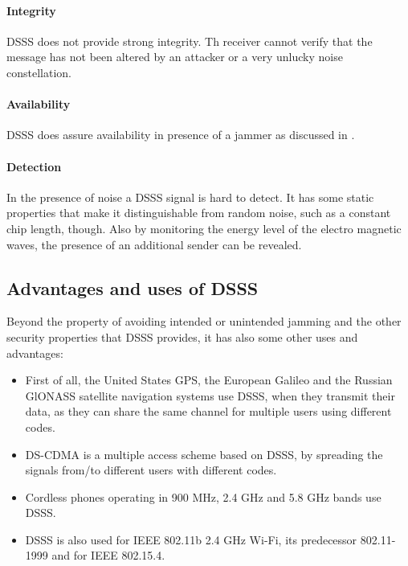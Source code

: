 \documentclass[12pt,a4paper]{article}
\begin{document}
	\paragraph{Integrity}
	DSSS does not provide strong integrity.
	Th receiver cannot verify that the message has not been altered by an attacker or a very unlucky noise constellation.
	
	\paragraph{Availability}
	DSSS does assure availability in presence of a jammer as discussed in .
	
	\paragraph{Detection} \cite{power}
	In the presence of noise a DSSS signal is hard to detect. It has some static properties that make it distinguishable from random noise, such as a constant chip length, though. Also by monitoring the energy level of the electro magnetic waves, the presence of an additional sender can be revealed.
	
\subsection{Advantages and uses of DSSS}
	Beyond the property of avoiding intended or unintended jamming and the other security properties that DSSS provides, it has also some other uses and advantages\cite{wiki:dsss}:
	
	\begin{itemize}
		
		\item{First of all, the United States GPS, the European Galileo and the Russian GlONASS satellite navigation systems use DSSS, when they transmit their data, as they can share the same channel for multiple users using different codes.}
		
		\item{DS-CDMA is a multiple access scheme based on DSSS, by spreading the signals from/to different users with different codes.}
		
		\item{Cordless phones operating in 900 MHz, 2.4 GHz and 5.8 GHz bands use DSSS.}
		
		\item{DSSS is also used for IEEE 802.11b 2.4 GHz Wi-Fi, its predecessor 802.11-1999 and for IEEE 802.15.4.}
		
	\end{itemize}
	
\end{document}
